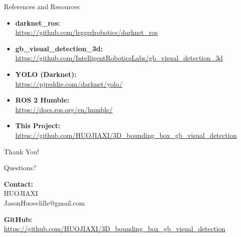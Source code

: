 \documentclass[aspectratio=169]{beamer}
\begin{document}
\begin{frame}{References and Resources}
\begin{itemize}
    \item \textbf{darknet\_ros:}\\
    \url{https://github.com/leggedrobotics/darknet_ros}

    \item \textbf{gb\_visual\_detection\_3d:}\\
    \url{https://github.com/IntelligentRoboticsLabs/gb_visual_detection_3d}

    \item \textbf{YOLO (Darknet):}\\
    \url{https://pjreddie.com/darknet/yolo/}

    \item \textbf{ROS 2 Humble:}\\
    \url{https://docs.ros.org/en/humble/}

    \item \textbf{This Project:}\\
    \url{https://github.com/HUOJIAXI/3D_bounding_box_gb_visual_detection}
\end{itemize}
\end{frame}

\begin{frame}
\begin{center}
{\Huge Thank You!}

\vspace{2em}

{\Large Questions?}

\vspace{3em}

\textbf{Contact:}\\
HUOJIAXI\\
JasonHuoeclille@gmail.com\\

\vspace{1em}

\textbf{GitHub:}\\
\url{https://github.com/HUOJIAXI/3D_bounding_box_gb_visual_detection}
\end{center}
\end{frame}
\end{document}
